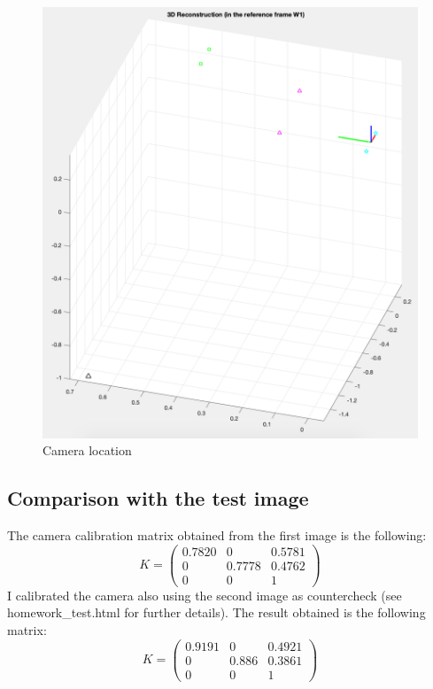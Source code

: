 \documentclass{article}
\begin{document}
\begin{figure}[hbt!]
\centering
\includegraphics[scale=0.45]{images/cameralocation.png}
\caption{Camera location}
\label{fig:cameralocation}
\end{figure}

\newpage
\subsection{Comparison with the test image}
The camera calibration matrix obtained from the first image is the following:
$$ K = \begin{pmatrix}
0.7820 & 0 & 0.5781 \\
0 & 0.7778 & 0.4762 \\
0 & 0 & 1
\end{pmatrix} $$
I calibrated the camera also using the second image as countercheck (see homework\_test.html for further details). The result obtained is the following matrix:
$$ K = \begin{pmatrix}
0.9191 & 0 & 0.4921 \\
0 & 0.886 & 0.3861 \\
0 & 0 & 1
\end{pmatrix} $$
\end{document}
